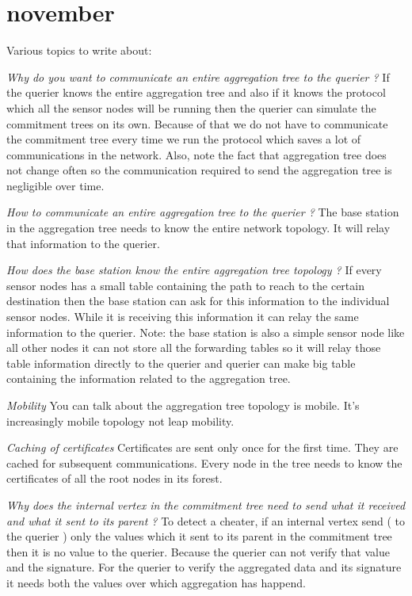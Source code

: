 \chapter{november}

Various topics to write about:

\textit{Why do you want to communicate an entire aggregation tree to the querier ?}
	If the querier knows the entire aggregation tree and also if it knows the protocol which all the sensor nodes will be running then the querier can simulate the commitment trees on its own. Because of that we do not have to communicate the commitment tree every time we run the protocol which saves a lot of communications in the network. Also, note the fact that aggregation tree does not change often so the communication required to send the aggregation tree is negligible over time.

\textit{How to communicate an entire aggregation tree to the querier ?}
	The base station in the aggregation tree needs to know the entire network topology.
	It will relay that information to the querier.

\textit{How does the base station know the entire aggregation tree topology ?}
	If every sensor nodes has a small table containing the path to reach to the certain destination then the base station can ask for this information to the individual sensor nodes. While it is receiving this information it can relay the same information to the querier. Note: the base station is also a simple sensor node like all other nodes it can not store all the forwarding tables so it will relay those table information directly to the querier and querier can make big table containing the information related to the aggregation tree.

\textit{Mobility}
	You can talk about the aggregation tree topology is mobile. It's increasingly mobile topology not leap mobility.

\textit{Caching of certificates}
		Certificates are sent only once for the first time. They are cached for subsequent communications. Every node in the tree needs to know the certificates of all the root nodes in its forest.

\textit{Why does the internal vertex in the commitment tree need to send what it received and what it sent to its parent ?}
	To detect a cheater, if an internal vertex send ( to the querier ) only the values which it sent to its parent in the commitment tree then it is no value to the querier. Because the querier can not verify that value and the signature. For the querier to verify the aggregated data and its signature it needs both the values over which aggregation has happend. 


